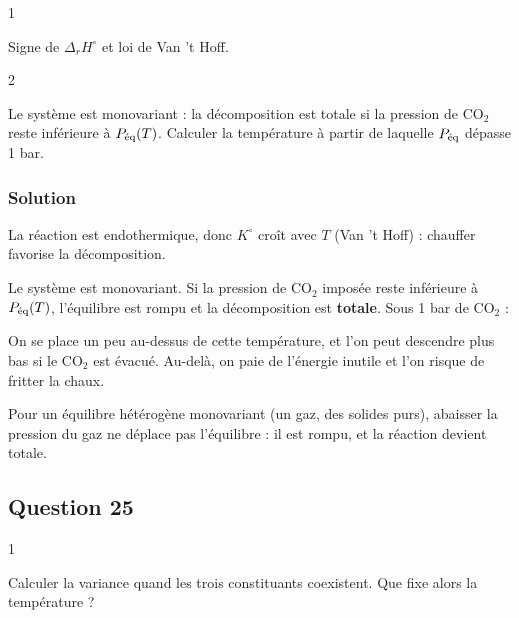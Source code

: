 \documentclass[11pt,a4paper]{article}
\newcommand{\equationajustee}[1]{%
  \sbox{\boiteequation}{$\displaystyle #1$}%
  \ifdim\wd\boiteequation>\linewidth
    \[\resizebox{\linewidth}{!}{\usebox{\boiteequation}}\]%
  \else
    \[#1\]%
  \fi}
\begin{document}
\begin{indication}{1}

Signe de \(\Delta_rH^\circ\) et loi de Van 't Hoff.

\end{indication}

\begin{indication}{2}

Le système est monovariant : la décomposition est totale si la pression de \(\mathrm{CO_2}\) reste inférieure à \(P_{\text{\text{éq}}}(T)\). Calculer la température à partir de laquelle \(P_{\text{\text{éq}}}\) dépasse 1 bar.

\end{indication}

\hypertarget{solution-23}{%
\subsubsection{Solution}\label{solution-23}}

La réaction est endothermique, donc \(K^\circ\) croît avec \(T\) (Van 't Hoff) : chauffer favorise la décomposition.

Le système est monovariant. Si la pression de \(\mathrm{CO_2}\) imposée reste inférieure à \(P_{\text{\text{éq}}}(T)\), l'équilibre est rompu et la décomposition est \textbf{totale}. Sous 1 bar de \(\mathrm{CO_2}\) :

\equationajustee{T>\frac{\Delta_rH^\circ}{\Delta_rS^\circ}=1{,}13\times10^3\ \mathrm K\ (\approx850\ ^\circ\mathrm C)}

On se place un peu au-dessus de cette température, et l'on peut descendre plus bas si le \(\mathrm{CO_2}\) est évacué. Au-delà, on paie de l'énergie inutile et l'on risque de fritter la chaux.

\begin{methode}

Pour un équilibre hétérogène monovariant (un gaz, des solides purs), abaisser la pression du gaz ne déplace pas l'équilibre : il est rompu, et la réaction devient totale.

\end{methode}

\hypertarget{question-25}{%
\subsection{Question 25}\label{question-25}}

\begin{indication}{1}

Calculer la variance quand les trois constituants coexistent. Que fixe alors la température ?

\end{indication}
\end{document}
